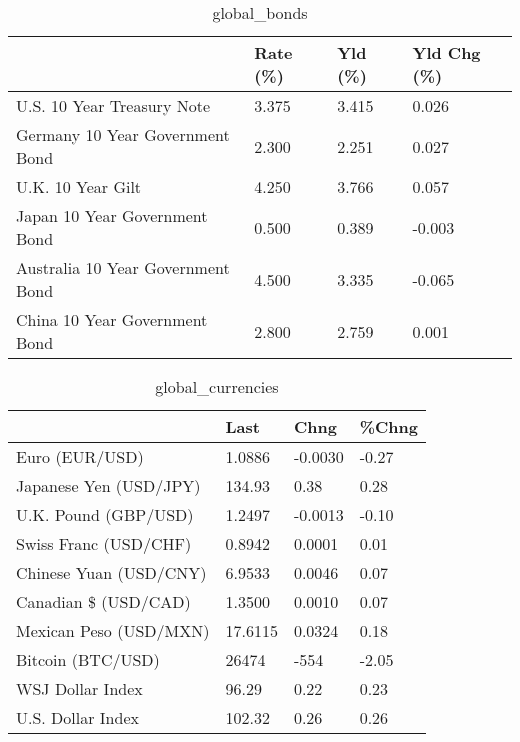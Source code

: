 \documentclass{article}%
\begin{document}
%


\begin{table}[htbp]%
\caption{global\_bonds}%
\centering%
\begin{adjustbox}{width=1\textwidth}%
\begin{tabular}{llll}
\toprule
                                  & Rate (\%) & Yld (\%) & Yld Chg (\%) \\
\midrule
       U.S. 10 Year Treasury Note &    3.375 &   3.415 &       0.026 \\
  Germany 10 Year Government Bond &    2.300 &   2.251 &       0.027 \\
                U.K. 10 Year Gilt &    4.250 &   3.766 &       0.057 \\
    Japan 10 Year Government Bond &    0.500 &   0.389 &      -0.003 \\
Australia 10 Year Government Bond &    4.500 &   3.335 &      -0.065 \\
    China 10 Year Government Bond &    2.800 &   2.759 &       0.001 \\
\bottomrule
\end{tabular}
%
\end{adjustbox}%
\end{table}

%


\begin{table}[htbp]%
\caption{global\_currencies}%
\centering%
\begin{adjustbox}{width=1\textwidth}%
\begin{tabular}{llll}
\toprule
                       &    Last &    Chng & \%Chng \\
\midrule
        Euro (EUR/USD) &  1.0886 & -0.0030 & -0.27 \\
Japanese Yen (USD/JPY) &  134.93 &    0.38 &  0.28 \\
  U.K. Pound (GBP/USD) &  1.2497 & -0.0013 & -0.10 \\
 Swiss Franc (USD/CHF) &  0.8942 &  0.0001 &  0.01 \\
Chinese Yuan (USD/CNY) &  6.9533 &  0.0046 &  0.07 \\
  Canadian \$ (USD/CAD) &  1.3500 &  0.0010 &  0.07 \\
Mexican Peso (USD/MXN) & 17.6115 &  0.0324 &  0.18 \\
     Bitcoin (BTC/USD) &   26474 &    -554 & -2.05 \\
      WSJ Dollar Index &   96.29 &    0.22 &  0.23 \\
     U.S. Dollar Index &  102.32 &    0.26 &  0.26 \\
\bottomrule
\end{tabular}
%
\end{adjustbox}%
\end{table}
\end{document}
